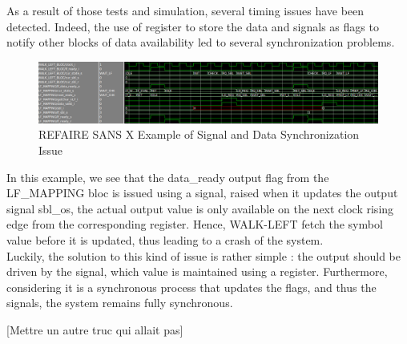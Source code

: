 As a result of those tests and simulation, several timing issues have been detected. Indeed, the use of register to store the data and signals as flags to notify other blocks of data availability led to several synchronization problems. 

\begin{figure}[H]
    \centering
    \hspace*{-10mm}\includegraphics[scale = 0.5]{Figures/lf_timing_issue.png}
    \caption{REFAIRE SANS X Example of Signal and Data Synchronization Issue}
    \label{fig:lf_timing}
\end{figure}

In this example, we see that the \textrm{data\_ready} output flag from the LF\_MAPPING bloc is issued using a signal, raised when it updates the output signal \textrm{sbl\_os}, the actual output value is only available on the next clock rising edge from the corresponding register. Hence, WALK-LEFT fetch the symbol value before it is updated, thus leading to a crash of the system. \\

Luckily, the solution to this kind of issue is rather simple : the output should be driven by the signal, which value is maintained using a register. Furthermore, considering it is a synchronous process that updates the flags, and thus the signals, the system remains fully synchronous.

[Mettre un autre truc qui allait pas]